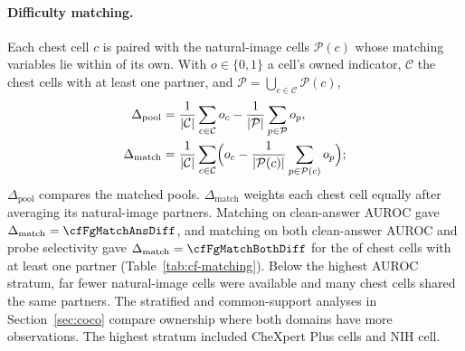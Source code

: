 \paragraph{Difficulty matching.} Each chest cell $c$ is paired with the natural-image cells $\mathcal P(c)$ whose matching variables lie within \cfFgWindow{} of its own. With $o\in\{0,1\}$ a cell's owned indicator, $\mathcal C$ the chest cells with at least one partner, and $\mathcal P=\bigcup_{c\in\mathcal C}\mathcal P(c)$,
\begin{equation}
\begin{aligned}
\Delta_{\text{pool}}&=\frac{1}{|\mathcal C|}\sum_{c\in\mathcal C}o_c-\frac{1}{|\mathcal P|}\sum_{p\in\mathcal P}o_p,\\
\Delta_{\text{match}}&=\frac{1}{|\mathcal C|}\sum_{c\in\mathcal C}\Bigl(o_c-\frac{1}{|\mathcal P(c)|}\sum_{p\in\mathcal P(c)}o_p\Bigr);
\end{aligned}
\label{eq:matching}
\end{equation}
$\Delta_{\text{pool}}$ compares the matched pools. $\Delta_{\text{match}}$ weights each chest cell equally after averaging its natural-image partners. Matching on clean-answer AUROC gave $\Delta_{\text{match}}=\cfFgMatchAnsDiff$, and matching on both clean-answer AUROC and probe selectivity gave $\Delta_{\text{match}}=\cfFgMatchBothDiff$ for the \cfFgMatchBothN{} of \cfFgMatchBothCells{} chest cells with at least one partner (Table~\ref{tab:cf-matching}). Below the highest AUROC stratum, far fewer natural-image cells were available and many chest cells shared the same partners. The stratified and common-support analyses in Section~\ref{sec:coco} compare ownership where both domains have more observations. The highest stratum included \cfStratChexTopN{} CheXpert Plus cells and \cfStratNihTopN{} NIH cell.

\begin{table}[pos=tp]
\centering
\setlength{\tabcolsep}{3pt}
\caption{\textbf{Difficulty matching.} Each row is one matching scheme. The columns give the matched chest cells, the natural-image partner cells, and the pooled and matched differences of Equation~\ref{eq:matching}.}
\label{tab:cf-matching}
\end{table}


